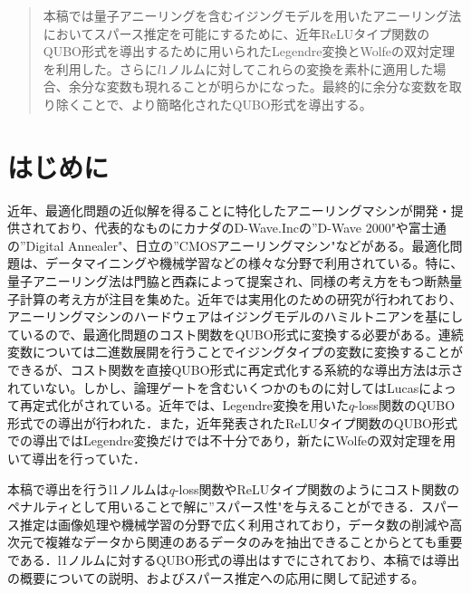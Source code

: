 \documentclass[paper]{ieicej}
\begin{document}
\begin{abstract}
  本稿では量子アニーリングを含むイジングモデルを用いたアニーリング法においてスパース推定を可能にするために、近年ReLUタイプ関数のQUBO形式を導出するために用いられたLegendre変換とWolfeの双対定理を利用した。さらに$l1$ノルムに対してこれらの変換を素朴に適用した場合、余分な変数も現れることが明らかになった。最終的に余分な変数を取り除くことで、より簡略化されたQUBO形式を導出する。
\end{abstract}
\begin{keyword}
\end{keyword}
\begin{eabstract}
\end{eabstract}
\begin{ekeyword}
\end{ekeyword}
\maketitle

\section{はじめに} 
近年、最適化問題の近似解を得ることに特化したアニーリングマシンが開発・提供されており、代表的なものにカナダのD-Wave.Incの''D-Wave 2000"や富士通の''Digital Annealer"、日立の''CMOSアニーリングマシン"などがある。最適化問題は、データマイニングや機械学習などの様々な分野で利用されている。特に、量子アニーリング法は門脇と西森によって提案され、同様の考え方をもつ断熱量子計算の考え方が注目を集めた。近年では実用化のための研究が行われており、
アニーリングマシンのハードウェアはイジングモデルのハミルトニアンを基にしているので、最適化問題のコスト関数をQUBO形式に変換する必要がある。連続変数については二進数展開を行うことでイジングタイプの変数に変換することができるが、コスト関数を直接QUBO形式に再定式化する系統的な導出方法は示されていない。しかし、論理ゲートを含むいくつかのものに対してはLucasによって再定式化がされている。近年では、Legendre変換を用いた$q$-loss関数のQUBO形式での導出が行われた．また，近年発表されたReLUタイプ関数のQUBO形式での導出ではLegendre変換だけでは不十分であり，新たにWolfeの双対定理を用いて導出を行っていた．

本稿で導出を行うl1ノルムは$q$-loss関数やReLUタイプ関数のようにコスト関数のペナルティとして用いることで解に''スパース性"を与えることができる．スパース推定は画像処理や機械学習の分野で広く利用されており，データ数の削減や高次元で複雑なデータから関連のあるデータのみを抽出できることからとても重要である．l1ノルムに対するQUBO形式の導出はすでにされており、本稿では導出の概要についての説明、およびスパース推定への応用に関して記述する。
\end{document}
